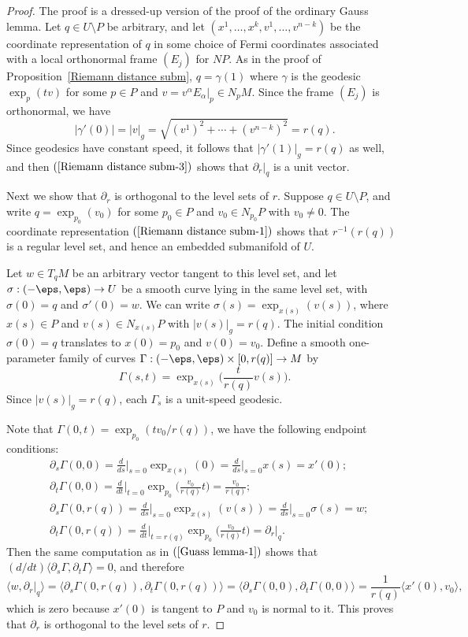 \begin{proof}
The proof is a dressed-up version of the proof of the ordinary Gauss lemma. Let $q\in U\setminus P$ be arbitrary, and let $(x^1,\dots,x^k,v^1,\dots,v^{n-k})$ be the 
coordinate representation of $q$ in some choice of Fermi coordinates associated with a local orthonormal frame $(E_j)$ for $NP$. As in the proof of 
Proposition~\ref{Riemann distance subm}, $q=\gamma(1)$ where $\gamma$ is the geodesic $\exp_p(tv)$ for some $p\in P$ and $v=v^\alpha E_\alpha|_p\in N_pM$. Since the 
frame $(E_j)$ is orthonormal, we have
\[|\gamma'(0)|=|v|_g=\sqrt{(v^1)^2+\cdots+(v^{n-k})^2}=r(q).\]
Since geodesics have constant speed, it follows that $|\gamma'(1)|_g=r(q)$ as well, and then $(\ref{Riemann distance subm-3})$ shows that $\partial_r|_q$ is a unit 
vector.\par
Next we show that $\partial_r$ is orthogonal to the level sets of $r$. Suppose $q\in U\setminus P$, and write $q=\exp_{p_0}(v_0)$ for some $p_0\in P$ and $v_0\in N_{p_0}P$ 
with $v_0\neq 0$. The coordinate representation $(\ref{Riemann distance subm-1})$ shows that $r^{-1}(r(q))$ is a regular level set, and hence an embedded submanifold 
of $U$.\par
Let $w\in T_qM$ be an arbitrary vector tangent to this level set, and let $\sigma:(-\eps,\eps)\to U$ be a smooth curve lying in the same level set, with $\sigma(0)=q$ 
and $\sigma'(0)=w$. We can write $\sigma(s)=\exp_{x(s)}(v(s))$, where $x(s)\in P$ and $v(s)\in N_{x(s)}P$ with $|v(s)|_g=r(q)$. The initial condition $\sigma(0)=q$ 
translates to $x(0)=p_0$ and $v(0)=v_0$. Define a smooth one-parameter family of curves $\Gamma:(-\eps,\eps)\times[0,r(q)]\to M$ by
\[\Gamma(s,t)=\exp_{x(s)}\Big(\frac{t}{r(q)}v(s)\Big).\]
Since $|v(s)|_g=r(q)$, each $\Gamma_s$ is a unit-speed geodesic.\par
Note that $\Gamma(0,t)=\exp_{p_0}(tv_0/r(q))$, we have the following endpoint conditions:
\begin{align*}
&\partial_s\Gamma(0,0)=\frac{d}{ds}\Big|_{s=0}\exp_{x(s)}(0)=\frac{d}{ds}\Big|_{s=0}x(s)=x'(0);\\
&\partial_t\Gamma(0,0)=\frac{d}{dt}\Big|_{t=0}\exp_{p_0}\Big(\frac{v_0}{r(q)}t\Big)=\frac{v_0}{r(q)};\\
&\partial_s\Gamma(0,r(q))=\frac{d}{ds}\Big|_{s=0}\exp_{x(s)}(v(s))=\frac{d}{ds}\Big|_{s=0}\sigma(s)=w;\\
&\partial_t\Gamma(0,r(q))=\frac{d}{dt}\Big|_{t=r(q)}\exp_{p_0}\Big(\frac{v_0}{r(q)}t\Big)=\partial_r|_q.
\end{align*}
Then the same computation as in $(\ref{Guass lemma-1})$ shows that $(d/dt)\langle\partial_s\Gamma,\partial_t\Gamma\rangle=0$, and therefore
\[\langle w,\partial_r|_q\rangle=\langle\partial_s\Gamma(0,r(q)),\partial_t\Gamma(0,r(q))\rangle=\langle\partial_s\Gamma(0,0),\partial_t\Gamma(0,0)\rangle=\frac{1}{r(q)}\langle x'(0),v_0\rangle,\]
which is zero because $x'(0)$ is tangent to $P$ and $v_0$ is normal to it. This proves that $\partial_r$ is orthogonal to the level sets of $r$.
\end{proof}
